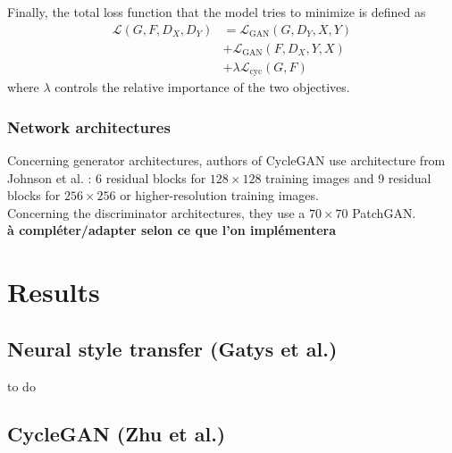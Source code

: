 \documentclass[twocolumn,superscriptaddress,aps]{revtex4-1}
\begin{document}
    Finally, the total loss function that the model tries to minimize is defined as
    \begin{align}
        \mathcal{L}\left(G, F, D_{X}, D_{Y}\right) &=\mathcal{L}_{\mathrm{GAN}}\left(G, D_{Y}, X, Y\right)\nonumber\\
        &+\mathcal{L}_{\mathrm{GAN}}\left(F, D_{X}, Y, X\right) \\ &+\lambda \mathcal{L}_{\mathrm{cyc}}(G, F)
    \end{align}
    where $\lambda$ controls the relative importance of the two objectives.
    
    \subsubsection{Network architectures}
    
    Concerning generator architectures, authors of CycleGAN use architecture from Johnson et al. \cite{DBLP:journals/corr/JohnsonAL16} : 6 residual blocks for $128 \times 128$ training images and 9 residual blocks for $256 \times 256$ or higher-resolution training images.\\
    
    Concerning the discriminator architectures, they use a $70 \times 70$ PatchGAN.\\
    
    {\bf à compléter/adapter selon ce que l'on implémentera}
    
    
    
    
    \section{Results}
    
    \subsection{Neural style transfer (Gatys et al.)}\label{results.gatys}
    
    to do
    
    \subsection{CycleGAN (Zhu et al.)}\label{results.zhu}
    
\end{document}
